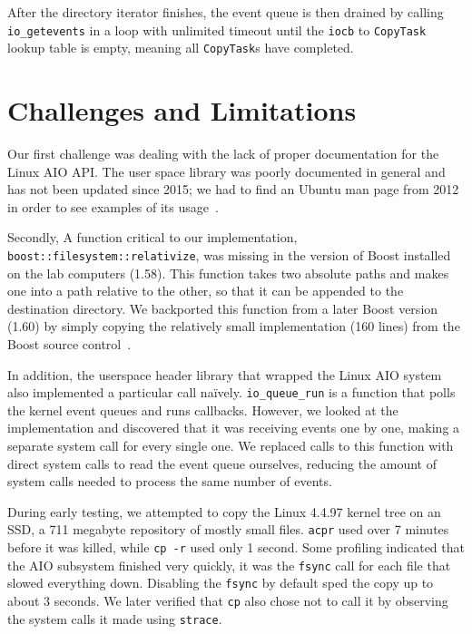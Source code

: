 \documentclass[11pt]{article}
\begin{document}
After the directory iterator finishes, the event queue is then drained by
calling \texttt{io\_getevents} in a loop with unlimited timeout until the
\texttt{iocb} to \texttt{CopyTask} lookup table is empty, meaning all
\texttt{CopyTask}s have completed.

\section{Challenges and Limitations} \label{sec:challenge}

Our first challenge was dealing with the lack of proper documentation for the
Linux AIO API. The user space library was poorly documented in general and has
not been updated since 2015; we had to find an Ubuntu man page from 2012 in
order to see examples of its usage~\cite{ubuntu}. 

Secondly, A function critical to our implementation,
\texttt{boost::filesystem::relativize}, was missing in the version of Boost
installed on the lab computers (1.58). This function takes two absolute paths
and makes one into a path relative to the other, so that it can be appended to
the destination directory. We backported this function from a later Boost
version (1.60) by simply copying the relatively small implementation (160 lines)
from the Boost source control~\cite{boost}.

In addition, the userspace header library that wrapped the Linux AIO system also
implemented a particular call na\"ively. \texttt{io\_queue\_run} is a function
that polls the kernel event queues and runs callbacks. However, we looked at the
implementation and discovered that it was receiving events one by one, making a
separate system call for every single one. We replaced calls to this function
with direct system calls to read the event queue ourselves, reducing the amount
of system calls needed to process the same number of events. 

During early testing, we attempted to copy the Linux 4.4.97 kernel tree on an
SSD, a 711 megabyte repository of mostly small files. \texttt{acpr} used over 7
minutes before it was killed, while \texttt{cp -r} used only 1 second. Some
profiling indicated that the AIO subsystem finished very quickly, it was the
\texttt{fsync} call for each file that slowed everything down. Disabling the
\texttt{fsync} by default sped the copy up to about 3 seconds. We later verified
that \texttt{cp} also chose not to call it by observing the system calls it made
using \texttt{strace}. 
\end{document}
